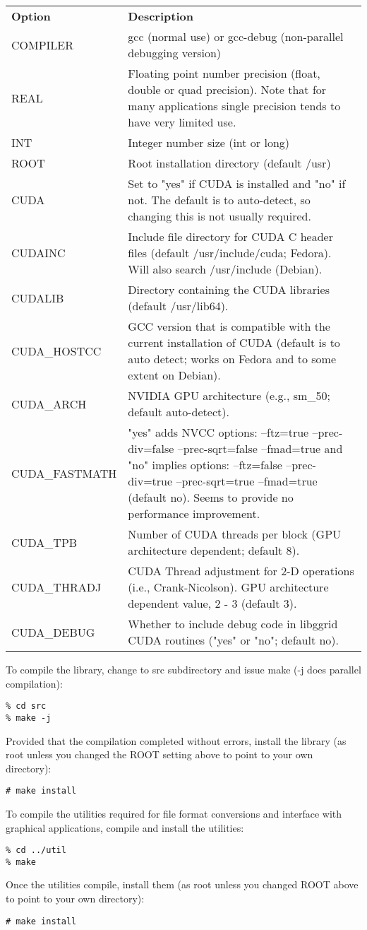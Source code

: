 \documentclass[12pt,letterpaper]{report}
\begin{document}
\begin{longtable}{p{} p{}}
\textbf{Option} & \textbf{Description}\\
\cline{1-2}
COMPILER & gcc (normal use) or gcc-debug (non-parallel debugging version)\\
REAL & Floating point number precision (float, double or quad precision). Note that for many applications single precision tends to have very limited use.\\
INT & Integer number size (int or long)\\
ROOT & Root installation directory (default /usr)\\
CUDA & Set to "yes" if CUDA is installed and "no" if not. The default is to auto-detect, so changing this is not usually required.\\
CUDAINC & Include file directory for CUDA C header files (default /usr/include/cuda; Fedora). Will also search /usr/include (Debian).\\
CUDALIB & Directory containing the CUDA libraries (default /usr/lib64).\\
CUDA\_HOSTCC & GCC version that is compatible with the current installation of CUDA (default is to auto detect; works on Fedora and to some extent on Debian).\\
CUDA\_ARCH & NVIDIA GPU architecture (e.g., sm\_50; default auto-detect).\\
CUDA\_FASTMATH & "yes" adds NVCC options: --ftz=true --prec-div=false --prec-sqrt=false --fmad=true and "no" implies options: --ftz=false --prec-div=true --prec-sqrt=true --fmad=true (default no). Seems to provide no performance improvement.\\
CUDA\_TPB & Number of CUDA threads per block (GPU architecture dependent; default 8).\\
CUDA\_THRADJ & CUDA Thread adjustment for 2-D operations (i.e., Crank-Nicolson). GPU architecture dependent value, 2 - 3 (default 3).\\
CUDA\_DEBUG & Whether to include debug code in libggrid CUDA routines ("yes" or "no"; default no).\\
\end{longtable}

\noindent
To compile the library, change to src subdirectory and issue make (-j does parallel compilation):
\begin{verbatim}
% cd src
% make -j
\end{verbatim}
Provided that the compilation completed without errors, install the library (as root unless you changed the ROOT setting above to point to your own directory):
\begin{verbatim}
# make install
\end{verbatim}
To compile the utilities required for file format conversions and interface with graphical applications, compile and install the utilities:
\begin{verbatim}
% cd ../util
% make
\end{verbatim}
Once the utilities compile, install them (as root unless you changed ROOT above to point to your own directory):
\begin{verbatim}
# make install
\end{verbatim}
\end{document}

